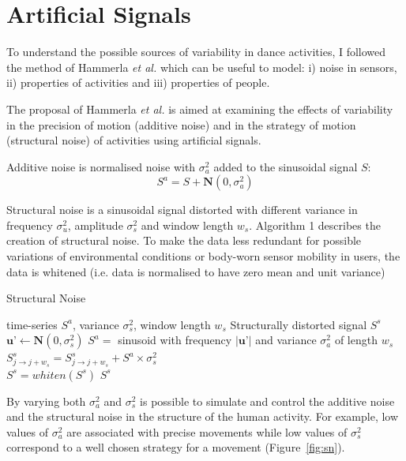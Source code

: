 \documentclass[10pt,journal,compsoc]{IEEEtran}
\begin{document}
\section{Artificial Signals}
To understand the possible sources of variability in dance activities, I
followed the method of Hammerla \textit{et al.} \cite{hammerla2011} which can be
useful to model: i) noise in sensors, ii) properties of activities and iii)
properties of people.

The proposal of Hammerla \textit{et al.} \cite{hammerla2011} is aimed at
examining the effects of variability in the precision of motion (additive noise)
and in the strategy of motion (structural noise) of activities using artificial
signals.

Additive noise is normalised noise with $\sigma_a ^2$ added to the sinusoidal
signal $S$:
\begin{equation}
 S^a = S + \textbf{N}(0, \sigma_a ^2)
\end{equation} 

Structural noise is a sinusoidal signal distorted with different variance in
frequency $\sigma_u ^2$, amplitude $\sigma_s ^2$ and window length
$w_s$. Algorithm 1 describes the creation of structural noise. To make the data
less redundant for possible variations of environmental conditions or body-worn
sensor mobility in users, the data is whitened (i.e. data is normalised to have
zero mean and unit variance)

\begin{algorithm}[H]
\caption{Structural Noise}
\begin{algorithmic}[1]
 \renewcommand{\algorithmicrequire}{\textbf{Input:}}
 \renewcommand{\algorithmicensure}{\textbf{Output:}} \REQUIRE time-series $S^a$,
 variance $\sigma_s ^2$, window length $w_s$ \ENSURE Structurally distorted
 signal $S^s$  \STATE $\textbf{u'} \leftarrow
 \textbf{N}(0, \sigma_s ^2)$ \STATE $S^{a} =$ sinusoid with frequency $|
 \textbf{u'} |$ and variance $\sigma_a ^2$ of length $w_s$ \STATE $S^s_{j
   \rightarrow j+w_s} = S^s_{j \rightarrow j+w_s} + S^{a} \times \sigma_s ^2 $
 \ENDFOR \\ $S^s= whiten (S^s)$ \RETURN $S^s$
\end{algorithmic}
\end{algorithm}

By varying both $\sigma_a ^2$ and $\sigma_s ^2$ is possible to simulate and
control the additive noise and the structural noise in the structure of the
human activity. For example, low values of $\sigma_a ^2$ are associated with
precise movements while low values of $\sigma_s ^2$ correspond to a well chosen
strategy for a movement (Figure~\ref{fig:sn}).
\end{document}
